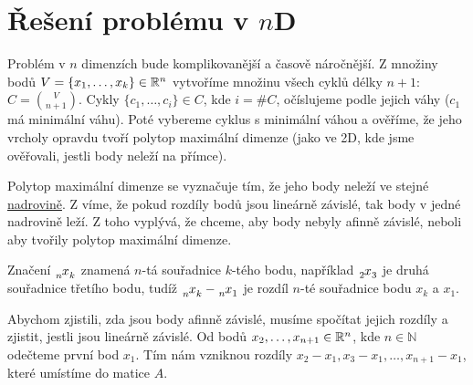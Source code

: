\section{Řešení problému v \texorpdfstring{$n$D}{nD}}
\label{sec:reseni_1D}

Problém v $n$ dimenzích bude komplikovanější a časově náročnější. Z množiny bodů $V = \{x_1,\ldots, x_k\} \in \mathbb{R}^n$ vytvoříme množinu všech cyklů délky $n+1$: $C = \binom{V}{n+1}$. Cykly $\{c_1, \dots, c_i\} \in C$, kde $i=\#C$, očíslujeme podle jejich váhy ($c_1$ má minimální váhu). Poté vybereme cyklus s minimální váhou a ověříme, že jeho vrcholy opravdu tvoří polytop maximální dimenze (jako ve 2D, kde jsme ověřovali, jestli body neleží na přímce).

Polytop maximální dimenze se vyznačuje tím, že jeho body neleží ve stejné \hyperref[definice:nadrovina]{nadrovině}. Z  víme, že pokud rozdíly bodů jsou lineárně závislé, tak body v jedné nadrovině leží. Z toho vyplývá, že chceme, aby body nebyly afinně závislé, neboli aby tvořily polytop maximální dimenze.  

\begin{poznamka} 
  \label{poznamka:varovani_index}
  Značení $\x{n}{k}$ znamená $n$-tá souřadnice $k$-tého bodu, například $\x{2}{3}$ je dru\-há souřadnice třetího bodu, tudíž $\x{n}{k} - \x{n}{1}$ je rozdíl $n$-té souřadnice bodu $x_k$ a $x_1$. 
\end{poznamka}

Abychom zjistili, zda jsou body afinně závislé, musíme spočítat jejich rozdíly a zjistit, jestli jsou lineárně závislé. Od bodů $x_2, \ldots, x_{n+1} \in \mathbb{R}^n$, kde  $n \in \mathbb{N}$ odečteme první bod $x_1$. Tím nám vzniknou rozdíly $x_2-x_1, x_3-x_1, \dots, x_{n+1}-x_1$, které umístíme do matice $A$. 


